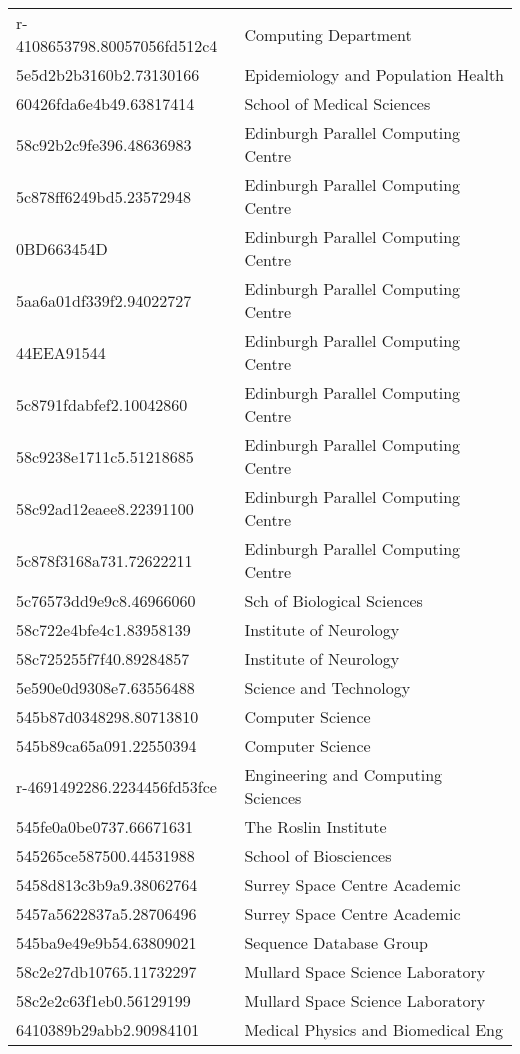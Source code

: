 \begin{tabular}{ll}
r-4108653798.80057056fd512c4 & Computing Department \\
5e5d2b2b3160b2.73130166 & Epidemiology and Population Health \\
60426fda6e4b49.63817414 & School of Medical Sciences \\
58c92b2c9fe396.48636983 & Edinburgh Parallel Computing Centre \\
5c878ff6249bd5.23572948 & Edinburgh Parallel Computing Centre \\
0BD663454D & Edinburgh Parallel Computing Centre \\
5aa6a01df339f2.94022727 & Edinburgh Parallel Computing Centre \\
44EEA91544 & Edinburgh Parallel Computing Centre \\
5c8791fdabfef2.10042860 & Edinburgh Parallel Computing Centre \\
58c9238e1711c5.51218685 & Edinburgh Parallel Computing Centre \\
58c92ad12eaee8.22391100 & Edinburgh Parallel Computing Centre \\
5c878f3168a731.72622211 & Edinburgh Parallel Computing Centre \\
5c76573dd9e9c8.46966060 & Sch of Biological Sciences \\
58c722e4bfe4c1.83958139 & Institute of Neurology \\
58c725255f7f40.89284857 & Institute of Neurology \\
5e590e0d9308e7.63556488 & Science and Technology \\
545b87d0348298.80713810 & Computer Science \\
545b89ca65a091.22550394 & Computer Science \\
r-4691492286.2234456fd53fce & Engineering and Computing Sciences \\
545fe0a0be0737.66671631 & The Roslin Institute \\
545265ce587500.44531988 & School of Biosciences \\
5458d813c3b9a9.38062764 & Surrey Space Centre Academic \\
5457a5622837a5.28706496 & Surrey Space Centre Academic \\
545ba9e49e9b54.63809021 & Sequence Database Group \\
58c2e27db10765.11732297 & Mullard Space Science Laboratory \\
58c2e2c63f1eb0.56129199 & Mullard Space Science Laboratory \\
6410389b29abb2.90984101 & Medical Physics and Biomedical Eng \\

\end{tabular}
